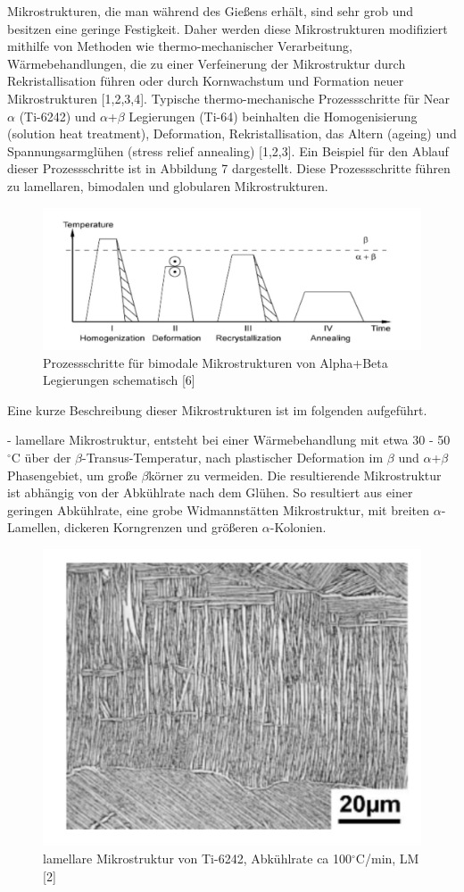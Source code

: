 Mikrostrukturen, die man während des Gießens erhält, sind sehr grob und besitzen eine geringe Festigkeit. Daher werden diese Mikrostrukturen modifiziert mithilfe von Methoden wie thermo-mechanischer Verarbeitung, Wärmebehandlungen, die zu einer Verfeinerung der Mikrostruktur durch Rekristallisation führen oder durch Kornwachstum und Formation neuer Mikrostrukturen [1,2,3,4].
Typische thermo-mechanische Prozessschritte für Near $\alpha$ (Ti-6242) und $\alpha$+$\beta$ Legierungen (Ti-64) beinhalten die Homogenisierung (solution heat treatment), Deformation, Rekristallisation, das Altern (ageing) und Spannungsarmglühen (stress relief annealing) [1,2,3]. Ein Beispiel für den Ablauf dieser Prozessschritte ist in Abbildung 7 dargestellt. Diese Prozessschritte führen zu lamellaren, bimodalen und globularen Mikrostrukturen.

\begin{figure}[h]
	\centering
	\includegraphics[width=0.9\linewidth]{"Bilder/Abbildung 7"}
	\caption[Abbildung 7]{Prozessschritte für bimodale Mikrostrukturen von Alpha+Beta Legierungen schematisch [6]}
	\label{fig:abbildung-7}
\end{figure}

Eine kurze Beschreibung dieser Mikrostrukturen ist im folgenden aufgeführt.

- lamellare Mikrostruktur, entsteht bei einer Wärmebehandlung mit etwa 30 - 50 $^\circ$C über der $\beta$-Transus-Temperatur, nach plastischer Deformation im $\beta$ und $\alpha$+$\beta$ Phasengebiet, um große $\beta$körner zu vermeiden. Die resultierende Mikrostruktur ist abhängig von der Abkühlrate nach dem Glühen. So resultiert aus einer geringen Abkühlrate, eine grobe Widmannstätten Mikrostruktur, mit breiten $\alpha$-Lamellen, dickeren Korngrenzen und größeren $\alpha$-Kolonien.

\begin{figure}[h]
	\centering
	\includegraphics[width=0.7\linewidth]{"Bilder/Abbildung 3"}
	\caption[Abbildung 3]{lamellare Mikrostruktur von Ti-6242, Abkühlrate ca 100$^\circ$C/min, LM [2]}
	\label{fig:abbildung-3}
\end{figure}

